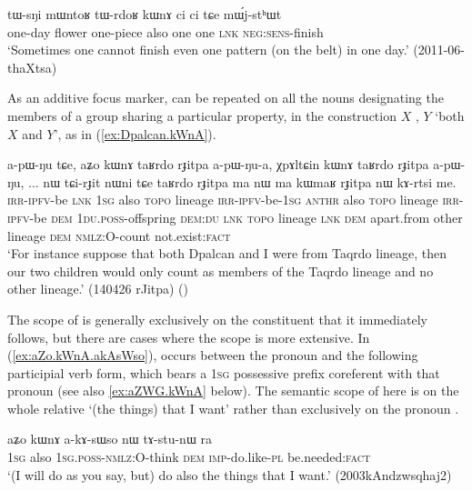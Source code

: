\begin{exe}
\ex \label{ex:tWrdoR.kWnA}
\gll tɯ-sŋi mɯntoʁ tɯ-rdoʁ kɯnɤ ci ci tɕe mɯ́j-stʰɯt \\
one-day flower one-piece also one one \textsc{lnk} \textsc{neg}:\textsc{sens}-finish \\
\glt `Sometimes one cannot finish even one pattern (on the belt) in one day.' (2011-06-thaXtsa)
\end{exe}

As an additive focus marker,  can be repeated on all the nouns designating the members of a group sharing a particular property, in the construction $X$ , $Y$   `both $X$ and $Y$', as in (\ref{ex:Dpalcan.kWnA}).

\begin{exe}
\ex \label{ex:Dpalcan.kWnA}
 \gll a-pɯ-ŋu tɕe, aʑo kɯnɤ taʁrdo rɟitpa a-pɯ-ŋu-a, χpɤltɕin kɯnɤ taʁrdo rɟitpa a-pɯ-ŋu, ... nɯ tɕi-rɟit nɯni tɕe taʁrdo rɟitpa ma nɯ ma kɯmaʁ rɟitpa nɯ kɤ-rtsi me.  \\
 \textsc{irr}-\textsc{ipfv}-be \textsc{lnk} \textsc{1sg} also  \textsc{topo} lineage  \textsc{irr}-\textsc{ipfv}-be-\textsc{1sg}   \textsc{anthr} also  \textsc{topo} lineage  \textsc{irr}-\textsc{ipfv}-be { } \textsc{dem} \textsc{1du}.\textsc{poss}-offspring \textsc{dem}:\textsc{du} \textsc{lnk}  \textsc{topo} lineage \textsc{lnk} \textsc{dem} apart.from other lineage \textsc{dem} \textsc{nmlz}:O-count not.exist:\textsc{fact} \\
 \glt `For instance suppose that both Dpalcan and I were from Taqrdo lineage, then our two children would only count as members of the Taqrdo lineage and no other lineage.' (140426 rJitpa)
()
\end{exe}

The scope of   is generally exclusively on the constituent that it immediately follows, but there are cases where the scope is more extensive. In (\ref{ex:aZo.kWnA.akAsWso}),  occurs between the pronoun  and the following participial verb form, which bears a \textsc{1sg} possessive prefix  coreferent with that pronoun (see also \ref{ex:aZWG.kWnA} below). The semantic scope of  here is on the whole relative  `(the things) that I want' rather than exclusively on the pronoun .

\begin{exe}
\ex \label{ex:aZo.kWnA.akAsWso}
 \gll aʑo kɯnɤ a-kɤ-sɯso nɯ tɤ-stu-nɯ ra \\
 \textsc{1sg} also \textsc{1sg}.\textsc{poss}-\textsc{nmlz}:O-think \textsc{dem} \textsc{imp}-do.like-\textsc{pl} be.needed:\textsc{fact} \\
 \glt `(I will do as you say, but) do also the things that I want.' (2003kAndzwsqhaj2)
\end{exe}

